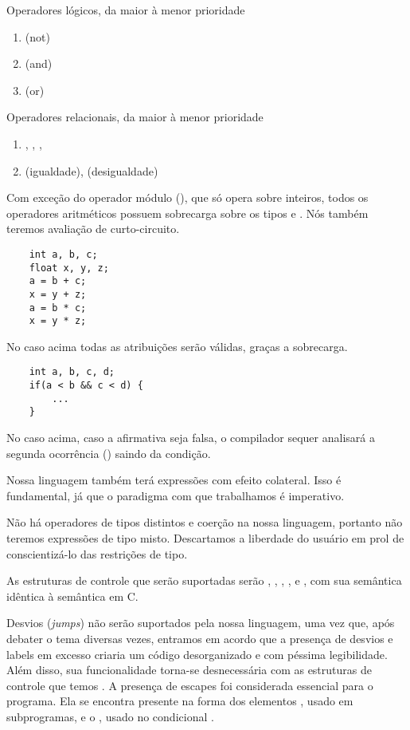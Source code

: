 Operadores lógicos, da maior à menor prioridade
\begin{enumerate}
    \item
    \ic{!} (not)
    \item
    \ic{&&} (and)
    \item
    \ic{||} (or)
\end{enumerate}

Operadores relacionais, da maior à menor prioridade

\begin{enumerate}
    \item
    \ic{>}, \ic{>=}, \ic{<}, \ic{<=}
    \item
    \ic{==} (igualdade), \ic{!=} (desigualdade)
\end{enumerate}

Com exceção do operador módulo (\ic{\%}), que só opera sobre inteiros, todos os
operadores aritméticos possuem sobrecarga sobre os tipos  e .
Nós também teremos avaliação de curto-circuito.

\begin{lstlisting}
    int a, b, c;
    float x, y, z;
    a = b + c;
    x = y + z;
    a = b * c;
    x = y * z;
\end{lstlisting}

No caso acima todas as atribuições serão válidas, graças a sobrecarga.

\begin{lstlisting}
    int a, b, c, d;
    if(a < b && c < d) {
        ...
    }
\end{lstlisting}

No caso acima, caso a afirmativa  seja falsa, o compilador sequer
analisará a segunda ocorrência () saindo da condição.

Nossa
linguagem também terá expressões com efeito colateral. Isso é fundamental, já
que o paradigma com que trabalhamos é imperativo.

Não há operadores de tipos
distintos e coerção na nossa linguagem, portanto não teremos expressões de tipo
misto. Descartamos a liberdade do usuário em prol de conscientizá-lo das
restrições de tipo.

As estruturas de controle que serão suportadas serão
, , , ,  e , com
sua semântica idêntica à semântica em C.

Desvios (\emph{jumps}) não serão
suportados pela nossa linguagem, uma vez que, após debater o tema diversas
vezes, entramos em acordo que a presença de desvios e labels em excesso criaria
um código desorganizado e com péssima legibilidade. Além disso, sua
funcionalidade torna-se desnecessária com as estruturas de controle que temos
.
A presença de escapes foi considerada essencial para o programa. Ela se
encontra presente na forma dos elementos , usado em subprogramas, e
o , usado no condicional .

